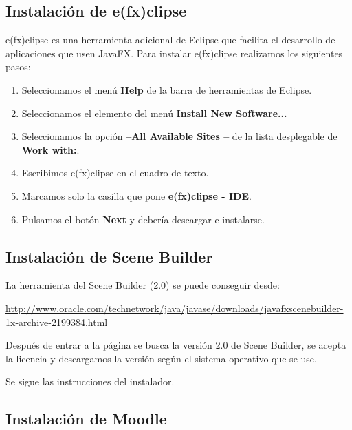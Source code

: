 \subsection{Instalación de e(fx)clipse}

e(fx)clipse es una herramienta adicional de Eclipse que facilita el desarrollo de aplicaciones que usen JavaFX. 
Para instalar e(fx)clipse realizamos los siguientes pasos:

\begin{enumerate}
	\item Seleccionamos el menú \textbf{Help} de la barra de herramientas de Eclipse.
	\item Seleccionamos el elemento del menú \textbf{Install New Software...}
	
	
	\item Seleccionamos la opción \textbf{--All Available Sites --} de la lista desplegable de \textbf{Work with:}.
	\item Escribimos e(fx)clipse en el cuadro de texto.
	\item Marcamos solo la casilla que pone \textbf{e(fx)clipse - IDE}.
	\item Pulsamos el botón \textbf{Next} y debería descargar e instalarse.
\end{enumerate}


\subsection{Instalación de Scene Builder}

La herramienta del Scene Builder (2.0) se puede conseguir desde: 

\href{http://www.oracle.com/technetwork/java/javase/downloads/javafxscenebuilder-1x-archive-2199384.html}{http://www.oracle.com/technetwork/java/javase/downloads/javafxscenebuilder-1x-archive-2199384.html}

Después de entrar a la página se busca la versión 2.0 de Scene Builder, se acepta la licencia y descargamos la versión según el sistema operativo que se use.


Se sigue las instrucciones del instalador.


\subsection{Instalación de Moodle}

